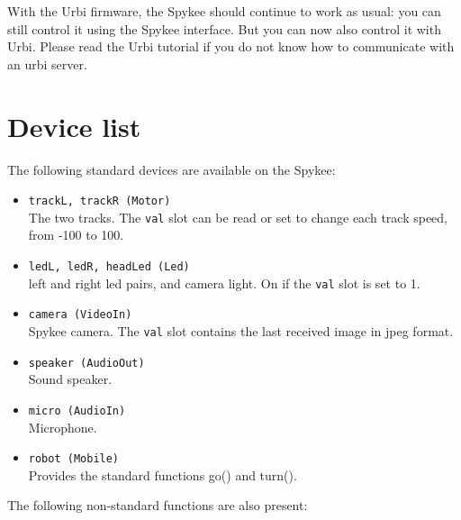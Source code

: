 With the Urbi firmware, the Spykee should continue to work as usual: you can
still control it using the Spykee interface. But you can now also control it
with Urbi. Please read the Urbi tutorial if you do not know how to communicate
with an urbi server.

\section{Device list}

The following standard devices are available on the Spykee:

\begin{itemize}
\item \lstinline|trackL, trackR (Motor)| \\
    The two tracks. The \lstinline|val| slot can be read or set to change each
    track speed, from -100 to 100.
\item \lstinline|ledL, ledR, headLed (Led)| \\
    left and right led pairs, and camera light. On if the \lstinline|val| slot
    is set to 1.
\item \lstinline|camera (VideoIn)| \\
    Spykee camera. The \lstinline|val| slot contains the last received image
    in jpeg format.
\item \lstinline|speaker (AudioOut)| \\
    Sound speaker.
\item \lstinline|micro (AudioIn)| \\
    Microphone.
\item \lstinline|robot (Mobile)| \\
    Provides the standard functions go() and turn().
\end{itemize}

The following non-standard functions are also present:

